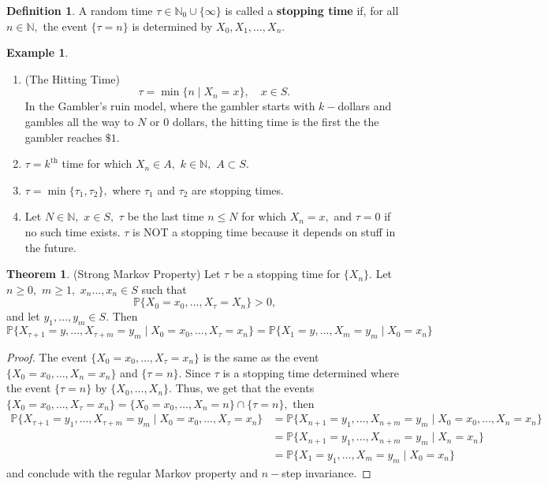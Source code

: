 \documentclass[10pt, oneside]{article}
\newcommand{\bbP}{\mathbb{P}}
\newcommand{\bbN}{\mathbb{N}}
\theoremstyle{definition}
\newtheorem{exmp}{Example}[section]
\newtheorem{thm}{Theorem}
\newtheorem{defn}{Definition}
\begin{document}
\begin{defn}
    A random time $\tau \in \bbN_0 \cup \{\infty\}$ is called a \textbf{stopping time} if, for all $n \in \bbN,$ the event $\{\tau = n\}$ is determined by $X_0, X_1, \dots, X_n.$ 
\end{defn}
\begin{exmp}
\begin{enumerate}
    \item (The Hitting Time) \[\tau = \min\{n \mid X_n = x\}, \quad x\in S.\]
    In the Gambler's ruin model, where the gambler starts with $k-$dollars and gambles all the way to $N$ or $0$ dollars, the hitting time is the first the the gambler reaches $\$1$.
    \item $\tau = k^\text{th}$ time for which $X_n \in A,$ $k\in \bbN,$ $A \subset S.$
    \item $\tau = \min\{\tau_1, \tau_2\},$ where $\tau_1$ and $\tau_2$ are stopping times. 
    \item Let $N \in \bbN,$ $x\in S,$ $\tau$ be the last time $n \leq N$ for which $X_n = x,$ and $\tau  = 0$ if no such time exists. $\tau$ is NOT a stopping time because it  depends on stuff in the future.
\end{enumerate}
\end{exmp}

\begin{thm}
    (Strong Markov Property) Let $\tau$ be a stopping time for $\{X_n\}.$ Let $n \geq 0,$ $m\geq 1,$ $x_n \dots, x_n \in S$ such that 
    \[\bbP\{X_0 = x_0, \dots, X_\tau = X_n\} >0,\] and 
    let $y_1, \dots, y_m \in S.$ Then 
    \[\bbP\{X_{\tau + 1} = y, \dots, X_{\tau + m} = y_m\mid X_0 = x_0, \dots, X_\tau = x_n\} =\bbP\{X_{1} = y, \dots, X_{ m} = y_m\mid X_0 = x_n\}\]
\end{thm}
\begin{proof}
    The event $\{X_0 = x_0, \dots, X_\tau = x_n\}$ is the same as the event $\{X_0 = x_0, \dots, X_n = x_n\}$ and $\{\tau = n\}.$ Since $\tau$ is a stopping time determined where the event $\{\tau = n\}$ by $\{X_0, \dots, X_n\}.$ Thus, we get that the events $\{X_0 = x_0, \dots, X_\tau = x_n\} = \{X_0 = x_0, \dots, X_n = n\}\cap \{\tau = n\},$ then 
    \begin{align*}
        \bbP\{X_{\tau + 1} = y_1, \dots, X_{\tau  + m} = y_m \mid X_0 = x_0, \dots, X_\tau = x_n\} &= \bbP\{X_{n + 1} = y_1, \dots, X_{n  + m} = y_m \mid X_0 = x_0, \dots, X_n = x_n\}\\
        &= \bbP\{X_{n + 1} = y_1, \dots, X_{n  + m} = y_m \mid X_n = x_n\}\\
        &= \bbP\{X_{1} = y_1, \dots, X_{ m} = y_m \mid X_0 = x_n\}
    \end{align*} and conclude with the regular Markov property and $n-$step invariance.
\end{proof}
\end{document}
